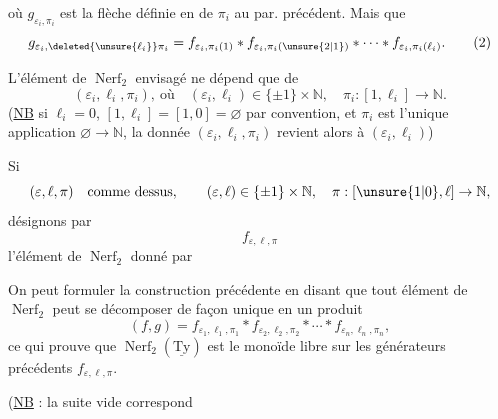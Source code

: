 

où $g_{\varepsilon_i,\pi_i}$ est la flèche définie en  de $\pi_i$ au par. précédent. Mais  que
\[
g_{\varepsilon_i,\deleted{\unsure{\ell_i}}\pi_i}
=f_{\varepsilon_i,\pi_i(1)}*f_{\varepsilon_i,\pi_i(\unsure{2|1})}*
\cdots*f_{\varepsilon_i,\pi_i(\ell_i)}.
\tag*{(2)}
\]

L'élément de $\operatorname{Nerf}_2$ envisagé ne dépend que de
\[
(\varepsilon_i,\ell_i,\pi_i),\ \text{où}\quad
(\varepsilon_i,\ell_i)\in\{\pm1\}\times\mathbb N,\quad
\pi_i:[1,\ell_i]\longrightarrow\mathbb N.
\]
(\uline{NB} si $\ell_i=0$, $[1,\ell_i]=[1,0]=\varnothing$ par convention, et $\pi_i$ est l'unique application $\varnothing\to\mathbb N$,  la donnée $(\varepsilon_i,\ell_i,\pi_i)$ revient alors à $(\varepsilon_i,\ell_i)$)

Si
\[
(\varepsilon,\ell,\pi)\quad\text{comme dessus},\qquad
(\varepsilon,\ell)\in\{\pm1\}\times\mathbb N,\quad\pi:[\unsure{1|0},\ell]\to\mathbb N,
\]
désignons par
\[
f_{\varepsilon,\ell,\pi}
\]
l'élément de $\operatorname{Nerf}_2$ donné par

On peut  formuler la construction précédente en disant que tout élément de $\operatorname{Nerf}_2$ peut se décomposer de façon unique en un produit \unsure{*}
\[
(f,g)=f_{\varepsilon_1,\ell_1,\pi_1}*f_{\varepsilon_2,\ell_2,\pi_2}*
\cdots*f_{\varepsilon_n,\ell_n,\pi_n},
\]
ce qui prouve que $\operatorname{Nerf}_2(\underline{\mathrm{Ty}})$ est le monoïde libre sur les générateurs précédents $f_{\varepsilon,\ell,\pi}$.

(\uline{NB} : la suite vide correspond
